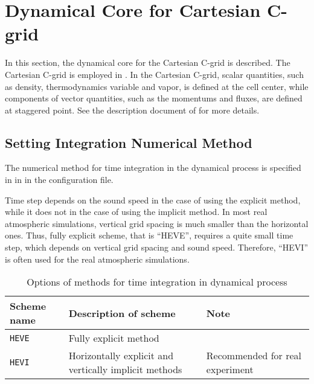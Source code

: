 \section{Dynamical Core for Cartesian C-grid} \label{sec:atmos_dyn_cartesC}
In this section, the dynamical core for the Cartesian C-grid is described.
The Cartesian C-grid is employed in \scalerm.
In the Cartesian C-grid, scalar quantities, such as density, thermodynamics variable and vapor, is defined at the cell center, while components of vector quantities, such as the momentums and fluxes, are defined at staggered point.
See the description document of \scalerm for more details.



\subsection{Setting Integration Numerical Method}  %
The numerical method for time integration in the dynamical process is specified in  in  in the configuration file.

Time step depends on the sound speed in the case of using the explicit method, while it does not in the case of using the implicit method.
In most real atmospheric simulations, vertical grid spacing is much smaller than the horizontal ones.
Thus, fully explicit scheme, that is ``HEVE'', requires a quite small time step, which depends on vertical grid spacing and sound speed.
Therefore, ``HEVI'' is often used for the real atmospheric simulations.



\begin{table}[bth]
\begin{center}
  \caption{Options of methods for time integration in dynamical process}
  \label{tab:nml_dyn}
  \begin{tabularx}{150mm}{llX} \hline
    \rowcolor[gray]{0.9}  Scheme name & Description of scheme & Note\\ \hline
      \verb|HEVE|  & Fully explicit method & \\
      \verb|HEVI|  & Horizontally explicit and vertically implicit methods & Recommended for real experiment\\
    \hline
  \end{tabularx}
\end{center}
\end{table}


